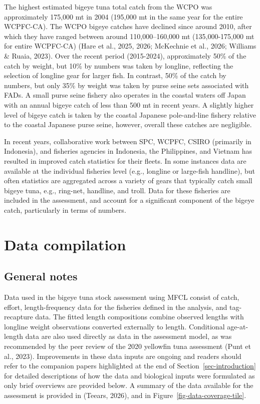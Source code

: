 \documentclass[
  english,
  a4paper,
  a4paper,
  11pt]{SCreport}
\begin{document}
The highest estimated bigeye tuna total catch from the WCPO was
approximately 175,000 mt in 2004 (195,000 mt in the same year for the
entire WCPFC-CA). The WCPO bigeye catches have declined since around
2010, after which they have ranged between around 110,000--160,000 mt
(135,000-175,000 mt for entire WCPFC-CA) (Hare et al., 2025, 2026;
McKechnie et al., 2026; Williams \& Ruaia, 2023). Over the recent period
(2015-2024), approximately 50\% of the catch by weight, but 10\% by
numbers was taken by longline, reflecting the selection of longline gear
for larger fish. In contrast, 50\% of the catch by numbers, but only
35\% by weight was taken by purse seine sets associated with FADs. A
small purse seine fishery also operates in the coastal waters off Japan
with an annual bigeye catch of less than 500 mt in recent years. A
slightly higher level of bigeye catch is taken by the coastal Japanese
pole-and-line fishery relative to the coastal Japanese purse seine,
however, overall these catches are negligible.

In recent years, collaborative work between SPC, WCPFC, CSIRO (primarily
in Indonesia), and fisheries agencies in Indonesia, the Philippines, and
Vietnam has resulted in improved catch statistics for their fleets. In
some instances data are available at the individual fisheries level
(e.g., longline or large-fish handline), but often statistics are
aggregated across a variety of gears that typically catch small bigeye
tuna, e.g., ring-net, handline, and troll. Data for these fisheries are
included in the assessment, and account for a significant component of
the bigeye catch, particularly in terms of numbers.

\section{Data compilation}\label{sec-data-compilation}

\subsection{General notes}\label{sec-general-notes}

Data used in the bigeye tuna stock assessment using MFCL consist of
catch, effort, length-frequency data for the fisheries defined in the
analysis, and tag-recapture data. The fitted length compositions combine
observed lengths with longline weight observations converted externally
to length. Conditional age-at-length data are also used directly as data
in the assessment model, as was recommended by the peer review of the
2020 yellowfin tuna assessment (Punt et al., 2023). Improvements in
these data inputs are ongoing and readers should refer to the companion
papers highlighted at the end of Section~\ref{sec-introduction} for
detailed descriptions of how the data and biological inputs were
formulated as only brief overviews are provided below. A summary of the
data available for the assessment is provided in (Teears, 2026), and in
Figure~\ref{fig-data-coverage-tile}.
\end{document}
